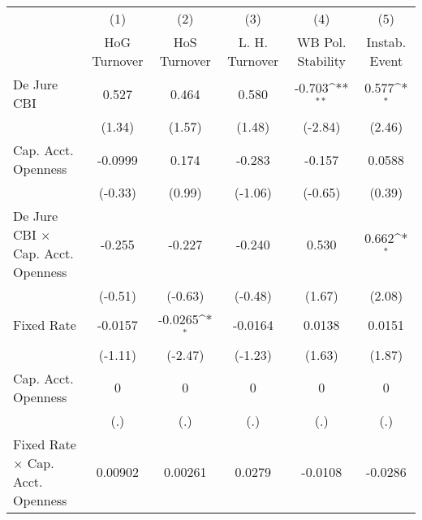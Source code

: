 \begin{table}[htbp]\centering
\def\sym#1{\ifmmode^{#1}\else\(^{#1}\)\fi}
\caption{\label{ikmultIndFEDJ}}
\begin{tabular}{l*{5}{c}}
\toprule
                                        &\multicolumn{1}{c}{(1)}&\multicolumn{1}{c}{(2)}&\multicolumn{1}{c}{(3)}&\multicolumn{1}{c}{(4)}&\multicolumn{1}{c}{(5)}\\
                                        &\multicolumn{1}{c}{HoG Turnover}&\multicolumn{1}{c}{HoS Turnover}&\multicolumn{1}{c}{L. H. Turnover}&\multicolumn{1}{c}{WB Pol. Stability}&\multicolumn{1}{c}{Instab. Event}\\
\midrule
De Jure CBI                             &    0.527         &    0.464         &    0.580         &   -0.703\sym{**} &    0.577\sym{*}  \\
                                        &   (1.34)         &   (1.57)         &   (1.48)         &  (-2.84)         &   (2.46)         \\
\addlinespace
Cap. Acct. Openness                     &  -0.0999         &    0.174         &   -0.283         &   -0.157         &   0.0588         \\
                                        &  (-0.33)         &   (0.99)         &  (-1.06)         &  (-0.65)         &   (0.39)         \\
\addlinespace
De Jure CBI $\times$ Cap. Acct. Openness&   -0.255         &   -0.227         &   -0.240         &    0.530         &    0.662\sym{*}  \\
                                        &  (-0.51)         &  (-0.63)         &  (-0.48)         &   (1.67)         &   (2.08)         \\
\addlinespace
Fixed Rate                              &  -0.0157         &  -0.0265\sym{*}  &  -0.0164         &   0.0138         &   0.0151         \\
                                        &  (-1.11)         &  (-2.47)         &  (-1.23)         &   (1.63)         &   (1.87)         \\
\addlinespace
Cap. Acct. Openness                     &        0         &        0         &        0         &        0         &        0         \\
                                        &      (.)         &      (.)         &      (.)         &      (.)         &      (.)         \\
\addlinespace
Fixed Rate $\times$ Cap. Acct. Openness &  0.00902         &  0.00261         &   0.0279         &  -0.0108         &  -0.0286         \\

\end{tabular}
\end{table}
